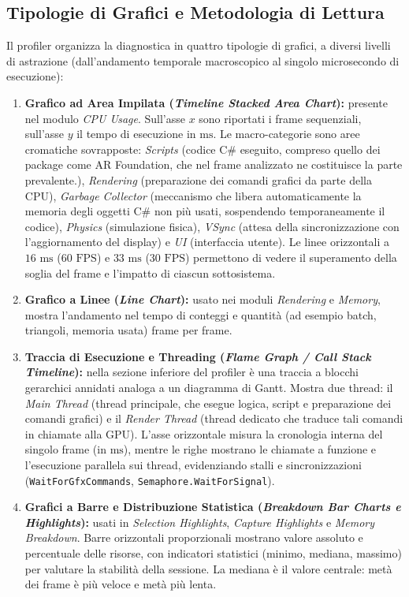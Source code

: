 \subsection{Tipologie di Grafici e Metodologia di Lettura}

Il profiler organizza la diagnostica in quattro tipologie di grafici, a diversi livelli di astrazione (dall'andamento temporale macroscopico al singolo microsecondo di esecuzione):

\begin{enumerate}
\item \textbf{Grafico ad Area Impilata (\textit{Timeline Stacked Area Chart}):} presente nel modulo \textit{CPU Usage}. Sull'asse $x$ sono riportati i frame sequenziali, sull'asse $y$ il tempo di esecuzione in $\text{ms}$. Le macro-categorie sono aree cromatiche sovrapposte: \textit{Scripts} (codice C\# eseguito, compreso quello dei package come AR Foundation, che nel frame analizzato ne costituisce la parte prevalente.), \textit{Rendering} (preparazione dei comandi grafici da parte della CPU), \textit{Garbage Collector} (meccanismo che libera automaticamente la memoria degli oggetti C\# non più usati, sospendendo temporaneamente il codice), \textit{Physics} (simulazione fisica), \textit{VSync} (attesa della sincronizzazione con l'aggiornamento del display) e \textit{UI} (interfaccia utente). Le linee orizzontali a $16\text{ ms}$ ($60\text{ FPS}$) e $33\text{ ms}$ ($30\text{ FPS}$) permettono di vedere il superamento della soglia del frame e l'impatto di ciascun sottosistema.

\item \textbf{Grafico a Linee (\textit{Line Chart}):} usato nei moduli \textit{Rendering} e \textit{Memory}, mostra l'andamento nel tempo di conteggi e quantità (ad esempio batch, triangoli, memoria usata) frame per frame.

\item \textbf{Traccia di Esecuzione e Threading (\textit{Flame Graph / Call Stack Timeline}):} nella sezione inferiore del profiler è una traccia a blocchi gerarchici annidati analoga a un diagramma di Gantt. Mostra due thread: il \textit{Main Thread} (thread principale, che esegue logica, script e preparazione dei comandi grafici) e il \textit{Render Thread} (thread dedicato che traduce tali comandi in chiamate alla GPU). L'asse orizzontale misura la cronologia interna del singolo frame (in $\text{ms}$), mentre le righe mostrano le chiamate a funzione e l'esecuzione parallela sui thread, evidenziando stalli e sincronizzazioni (\texttt{WaitForGfx\allowbreak Commands}, \texttt{Semaphore.\allowbreak WaitForSignal}).

\item \textbf{Grafici a Barre e Distribuzione Statistica (\textit{Breakdown Bar Charts e Highlights}):} usati in \textit{Selection Highlights}, \textit{Capture Highlights} e \textit{Memory Breakdown}. Barre orizzontali proporzionali mostrano valore assoluto e percentuale delle risorse, con indicatori statistici (minimo, mediana, massimo) per valutare la stabilità della sessione. La mediana è il valore centrale: metà dei frame è più veloce e metà più lenta.
\end{enumerate}

